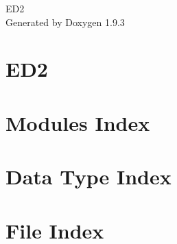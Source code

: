 \documentclass[twoside]{book}
\newcommand{\+}{\discretionary{\mbox{\scriptsize$\hookleftarrow$}}{}{}}
\newcommand{\clearemptydoublepage}{%
    \newpage{\pagestyle{empty}\cleardoublepage}%
  }
\begin{document}
  \raggedbottom
    \hypersetup{pageanchor=false,
                bookmarksnumbered=true,
                pdfencoding=unicode
               }
  \begin{titlepage}
  \vspace*{7cm}
  \begin{center}%
  {\Large ED2}\\
  \vspace*{1cm}
  {\large Generated by Doxygen 1.9.3}\\
  \end{center}
  \end{titlepage}
  \clearemptydoublepage
  \tableofcontents
  \clearemptydoublepage
  \hypersetup{pageanchor=true}
\chapter{ED2}
\label{index}\hypertarget{index}{}
\chapter{Modules Index}

\chapter{Data Type Index}

\chapter{File Index}

\end{document}
